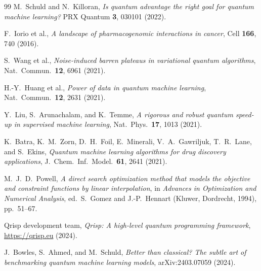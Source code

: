\documentclass[twocolumn,aps,pra,superscriptaddress,floatfix]{revtex4-2}
\begin{document}
\begin{thebibliography}{99}
M.~Schuld and N.~Killoran,
\textit{Is quantum advantage the right goal for quantum machine learning?}
PRX Quantum \textbf{3}, 030101 (2022).

F.~Iorio et al.,
\textit{A landscape of pharmacogenomic interactions in cancer},
Cell \textbf{166}, 740 (2016).

S.~Wang et al.,
\textit{Noise-induced barren plateaus in variational quantum algorithms},
Nat.\ Commun.\ \textbf{12}, 6961 (2021).

H.-Y.~Huang et al.,
\textit{Power of data in quantum machine learning},
Nat.\ Commun.\ \textbf{12}, 2631 (2021).

Y.~Liu, S.~Arunachalam, and K.~Temme,
\textit{A rigorous and robust quantum speed-up in supervised machine learning},
Nat.\ Phys.\ \textbf{17}, 1013 (2021).

K.~Batra, K.~M.~Zorn, D.~H.~Foil, E.~Minerali, V.~A.~Gawriljuk,
T.~R.~Lane, and S.~Ekins,
\textit{Quantum machine learning algorithms for drug discovery applications},
J.\ Chem.\ Inf.\ Model.\ \textbf{61}, 2641 (2021).

M.~J.~D.~Powell,
\textit{A direct search optimization method that models the objective and
constraint functions by linear interpolation},
in \textit{Advances in Optimization and Numerical Analysis},
ed.\ S.~Gomez and J.-P.~Hennart (Kluwer, Dordrecht, 1994), pp.~51--67.

Qrisp development team,
\textit{Qrisp: A high-level quantum programming framework},
\url{https://qrisp.eu} (2024).

J.~Bowles, S.~Ahmed, and M.~Schuld,
\textit{Better than classical? The subtle art of benchmarking quantum machine
learning models},
arXiv:2403.07059 (2024).

\end{thebibliography}
\end{document}
